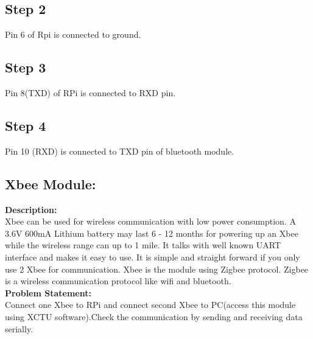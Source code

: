 \documentclass[a4paper,12pt,oneside]{book}
\begin{document}
\subsection*{Step 2}
Pin 6 of Rpi is connected to ground.
\subsection*{Step 3}
Pin 8(TXD) of RPi is connected to RXD pin.
\subsection*{Step 4}
Pin 10 (RXD) is connected to TXD pin of bluetooth module.
\subsection{Xbee Module:}
\textbf{Description:} \\
Xbee can be used for wireless communication with low power consumption. A 3.6V 600mA Lithium battery may last 6 - 12 months for powering up an Xbee while the wireless range can up to 1 mile. It talks with well known UART interface and makes it easy to use. It is simple and straight forward if you only use 2 Xbee for communication. Xbee is the module using Zigbee protocol. Zigbee is a wireless communication protocol like wifi and bluetooth. \\
\textbf{Problem Statement:} \\
Connect one Xbee to RPi and connect second Xbee to PC(access this module using XCTU software).Check the communication by sending and receiving data serially.
\end{document}
